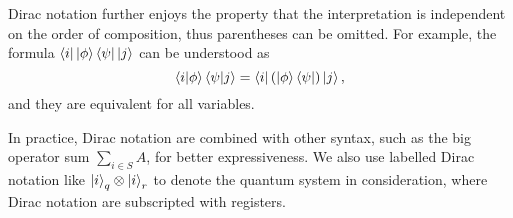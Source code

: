 \documentclass[runningheads]{llncs}
\begin{document}
Dirac notation further enjoys the property that the interpretation is independent on the order of composition, thus parentheses can be omitted. For example, the formula \(\bra{i}\ket{\phi}\bra{\psi}\ket{j}\) can be understood as
\[
    \braket{i|\phi}\braket{\psi|j} = \bra{i} (\ket{\phi}\bra{\psi}) \ket{j},
\]
and they are equivalent for all variables.


In practice, Dirac notation are combined with other syntax, such as the big operator sum $\sum_{i \in S} A$, for better expressiveness. We also use labelled Dirac notation like $\ket{i}_q \otimes \ket{i}_r$ to denote the quantum system in consideration, where Dirac notation are subscripted with registers.
\end{document}
